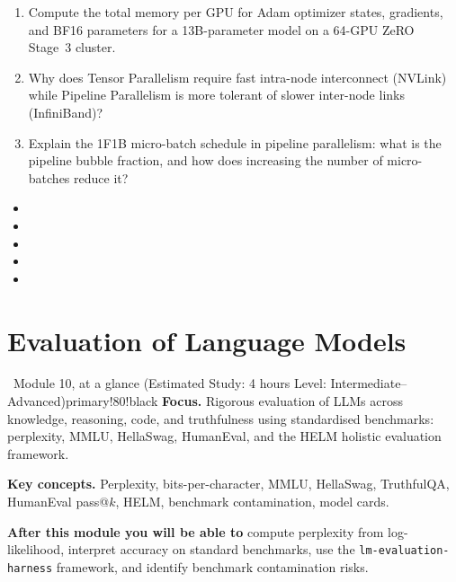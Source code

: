 \documentclass[11pt,a4paper]{article}
\begin{document}
	\begin{checkpoint}
		\begin{enumerate}
			\item Compute the total memory per GPU for Adam optimizer states, gradients, and BF16 parameters for a 13B-parameter model on a 64-GPU ZeRO Stage~3 cluster.
			\item Why does Tensor Parallelism require fast intra-node interconnect (NVLink) while Pipeline Parallelism is more tolerant of slower inter-node links (InfiniBand)?
			\item Explain the 1F1B micro-batch schedule in pipeline parallelism: what is the pipeline bubble fraction, and how does increasing the number of micro-batches reduce it?
		\end{enumerate}
	\end{checkpoint}

	\begin{sourcesbox}
		\small
		\begin{itemize}[nosep]
			\item {}
			\item {}
			\item {}
			\item {}
			\item {}
		\end{itemize}
	\end{sourcesbox}

	\clearpage
	\section{Evaluation of Language Models}
	\label{sec:evaluation}

	\begin{modulecard}{\faChartBar\ Module 10, at a glance \hfill \small\normalfont (Estimated Study: 4 hours \textbullet{} Level: Intermediate--Advanced)}{primary!80!black}
		\textbf{Focus.} Rigorous evaluation of LLMs across knowledge, reasoning, code, and truthfulness using standardised benchmarks: perplexity, MMLU, HellaSwag, HumanEval, and the HELM holistic evaluation framework.

		\medskip
		\textbf{Key concepts.} Perplexity, bits-per-character, MMLU, HellaSwag, TruthfulQA, HumanEval pass@$k$, HELM, benchmark contamination, model cards.

		\medskip
		\textbf{After this module you will be able to} compute perplexity from log-likelihood, interpret accuracy on standard benchmarks, use the \texttt{lm-evaluation-harness} framework, and identify benchmark contamination risks.
	\end{modulecard}
\end{document}
